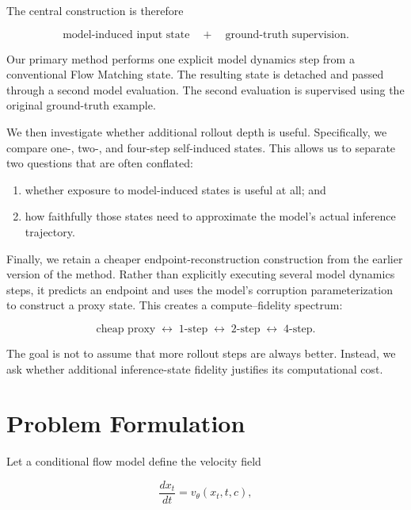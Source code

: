 \documentclass[11pt]{article}
\begin{document}
The central construction is therefore

\begin{equation}
\boxed{
\text{model-induced input state}
\quad+\quad
\text{ground-truth supervision}.
}
\end{equation}

Our primary method performs one explicit model dynamics step from a conventional
Flow Matching state. The resulting state is detached and passed through a
second model evaluation. The second evaluation is supervised using the
original ground-truth example.

We then investigate whether additional rollout depth is useful. Specifically,
we compare one-, two-, and four-step self-induced states. This allows us to
separate two questions that are often conflated:

\begin{enumerate}[leftmargin=*]
    \item whether exposure to model-induced states is useful at all; and
    \item how faithfully those states need to approximate the model's actual
    inference trajectory.
\end{enumerate}

Finally, we retain a cheaper endpoint-reconstruction construction from the
earlier version of the method. Rather than explicitly executing several model
dynamics steps, it predicts an endpoint and uses the model's corruption
parameterization to construct a proxy state. This creates a compute--fidelity
spectrum:

\begin{equation}
\boxed{
\text{cheap proxy}
\;\longleftrightarrow\;
\text{1-step}
\;\longleftrightarrow\;
\text{2-step}
\;\longleftrightarrow\;
\text{4-step}.
}
\end{equation}

The goal is not to assume that more rollout steps are always better. Instead,
we ask whether additional inference-state fidelity justifies its computational
cost.

\section{Problem Formulation}

Let a conditional flow model define the velocity field

\begin{equation}
\frac{d x_t}{dt}
=
v_\theta(x_t,t,c),
\end{equation}
\end{document}
